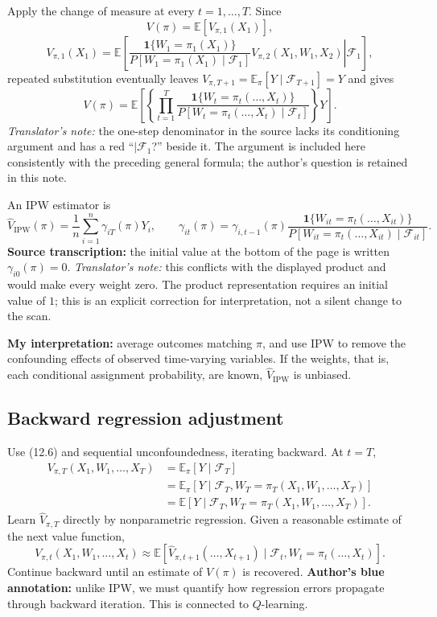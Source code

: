 Apply the change of measure at every $t=1,\ldots,T$. Since
\[
 V(\pi)=\mathbb E[V_{\pi,1}(X_1)],
\]
\[
 V_{\pi,1}(X_1)=\mathbb E\left[\left.
 \frac{\mathbf1\{W_1=\pi_1(X_1)\}}
 {P[W_1=\pi_1(X_1)\mid\mathcal F_1]}
 V_{\pi,2}(X_1,W_1,X_2)\right|\mathcal F_1\right],
\]
repeated substitution eventually leaves $V_{\pi,T+1}=\mathbb E_\pi[Y\mid\mathcal F_{T+1}]=Y$ and gives
\[
 V(\pi)=\mathbb E\left[
 \left\{\prod_{t=1}^T
 \frac{\mathbf1\{W_t=\pi_t(\ldots,X_t)\}}
 {P[W_t=\pi_t(\ldots,X_t)\mid\mathcal F_t]}\right\}Y\right].
\]
\textit{Translator's note:} the one-step denominator in the source lacks its conditioning argument and has a red ``$\mid\mathcal F_1$?'' beside it. The argument is included here consistently with the preceding general formula; the author's question is retained in this note.

An IPW estimator is
\[
 \widehat V_{\mathrm{IPW}}(\pi)=\frac1n\sum_{i=1}^n\gamma_{iT}(\pi)Y_i,
 \qquad
 \gamma_{it}(\pi)=\gamma_{i,t-1}(\pi)
 \frac{\mathbf1\{W_{it}=\pi_t(\ldots,X_{it})\}}
 {P[W_{it}=\pi_t(\ldots,X_{it})\mid\mathcal F_{it}]}.
\]
\textbf{Source transcription:} the initial value at the bottom of the page is written $\gamma_{i0}(\pi)=0$.
\textit{Translator's note:} this conflicts with the displayed product and would make every weight zero. The product representation requires an initial value of $1$; this is an explicit correction for interpretation, not a silent change to the scan.

\textbf{My interpretation:} average outcomes matching $\pi$, and use IPW to remove the confounding effects of observed time-varying variables. If the weights, that is, each conditional assignment probability, are known, $\widehat V_{\mathrm{IPW}}$ is unbiased.

\subsection{Backward regression adjustment}
Use (12.6) and sequential unconfoundedness, iterating backward. At $t=T$,
\begin{align*}
 V_{\pi,T}(X_1,W_1,\ldots,X_T)
 &=\mathbb E_\pi[Y\mid\mathcal F_T]\\
 &=\mathbb E_\pi[Y\mid\mathcal F_T,W_T=\pi_T(X_1,W_1,\ldots,X_T)]\\
 &=\mathbb E[Y\mid\mathcal F_T,W_T=\pi_T(X_1,W_1,\ldots,X_T)].
\end{align*}
Learn $\widehat V_{\pi,T}$ directly by nonparametric regression. Given a reasonable estimate of the next value function,
\[
 V_{\pi,t}(X_1,W_1,\ldots,X_t)
 \approx\mathbb E[\widehat V_{\pi,t+1}(\ldots,X_{t+1})
 \mid\mathcal F_t,W_t=\pi_t(\ldots,X_t)].\tag{12.12}
\]
Continue backward until an estimate of $V(\pi)$ is recovered.
\textbf{Author's blue annotation:} unlike IPW, we must quantify how regression errors propagate through backward iteration. This is connected to $Q$-learning.

